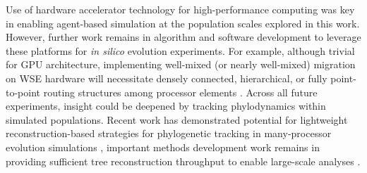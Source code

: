 

Use of hardware accelerator technology for high-performance computing was key in enabling agent-based simulation at the population scales explored in this work.
However, further work remains in algorithm and software development to leverage these platforms for \textit{in silico} evolution experiments.
For example, although trivial for GPU architecture, implementing well-mixed (or nearly well-mixed) migration on WSE hardware will necessitate densely connected, hierarchical, or fully point-to-point routing structures among processor elements \citep{james2020physical,luczynski2024near}.
Across all future experiments, insight could be deepened by tracking phylodynamics within simulated populations.
Recent work has demonstrated potential for lightweight reconstruction-based strategies for phylogenetic tracking in many-processor evolution simulations \citep{moreno2022hereditary}, important methods development work remains in providing sufficient tree reconstruction throughput to enable large-scale analyses \citep{moreno2024trackable}.

